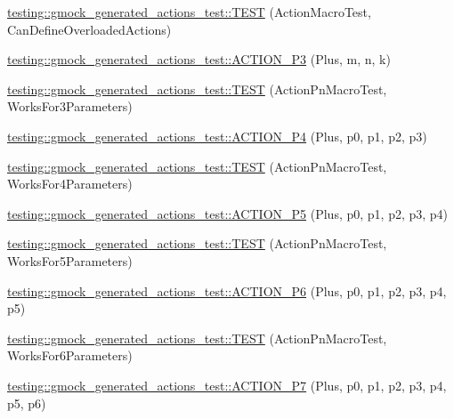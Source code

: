 \begin{DoxyCompactItemize}
\item 
\hyperlink{namespacetesting_1_1gmock__generated__actions__test_a8a3d26365bdae172067fe3a63bd88e85}{testing\+::gmock\+\_\+generated\+\_\+actions\+\_\+test\+::\+T\+E\+ST} (Action\+Macro\+Test, Can\+Define\+Overloaded\+Actions)
\item 
\hyperlink{namespacetesting_1_1gmock__generated__actions__test_a35c62beac532eaff7e54b8ad4a7fe1cf}{testing\+::gmock\+\_\+generated\+\_\+actions\+\_\+test\+::\+A\+C\+T\+I\+O\+N\+\_\+\+P3} (Plus, m, n, k)
\item 
\hyperlink{namespacetesting_1_1gmock__generated__actions__test_a3579cf2428f584d2a837c2c219ec1d5a}{testing\+::gmock\+\_\+generated\+\_\+actions\+\_\+test\+::\+T\+E\+ST} (Action\+Pn\+Macro\+Test, Works\+For3\+Parameters)
\item 
\hyperlink{namespacetesting_1_1gmock__generated__actions__test_ac86e9e1fa5be82823e80247ba093301c}{testing\+::gmock\+\_\+generated\+\_\+actions\+\_\+test\+::\+A\+C\+T\+I\+O\+N\+\_\+\+P4} (Plus, p0, p1, p2, p3)
\item 
\hyperlink{namespacetesting_1_1gmock__generated__actions__test_a6c13e382007960236763d638542bc5fe}{testing\+::gmock\+\_\+generated\+\_\+actions\+\_\+test\+::\+T\+E\+ST} (Action\+Pn\+Macro\+Test, Works\+For4\+Parameters)
\item 
\hyperlink{namespacetesting_1_1gmock__generated__actions__test_a948863fb38d913f02a0c5bde6be0b0a0}{testing\+::gmock\+\_\+generated\+\_\+actions\+\_\+test\+::\+A\+C\+T\+I\+O\+N\+\_\+\+P5} (Plus, p0, p1, p2, p3, p4)
\item 
\hyperlink{namespacetesting_1_1gmock__generated__actions__test_a132cab07373e037a06807a5948b1410b}{testing\+::gmock\+\_\+generated\+\_\+actions\+\_\+test\+::\+T\+E\+ST} (Action\+Pn\+Macro\+Test, Works\+For5\+Parameters)
\item 
\hyperlink{namespacetesting_1_1gmock__generated__actions__test_a97cbcc90a3063a1882886ded61fc8979}{testing\+::gmock\+\_\+generated\+\_\+actions\+\_\+test\+::\+A\+C\+T\+I\+O\+N\+\_\+\+P6} (Plus, p0, p1, p2, p3, p4, p5)
\item 
\hyperlink{namespacetesting_1_1gmock__generated__actions__test_a9031cb5f0e3d9de21ed3ff0a98a311d4}{testing\+::gmock\+\_\+generated\+\_\+actions\+\_\+test\+::\+T\+E\+ST} (Action\+Pn\+Macro\+Test, Works\+For6\+Parameters)
\item 
\hyperlink{namespacetesting_1_1gmock__generated__actions__test_a58bc376a0637fc1e89e6503466d1b9cd}{testing\+::gmock\+\_\+generated\+\_\+actions\+\_\+test\+::\+A\+C\+T\+I\+O\+N\+\_\+\+P7} (Plus, p0, p1, p2, p3, p4, p5, p6)

\end{DoxyCompactItemize}
